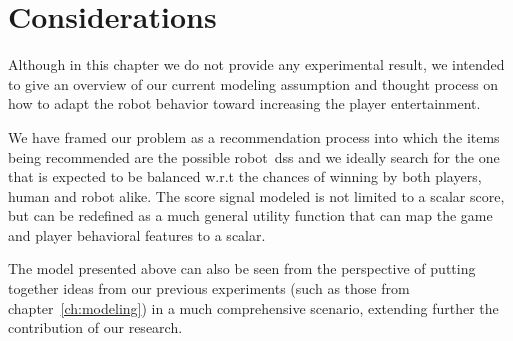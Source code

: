 \section{Considerations}
Although in this chapter we do not provide any experimental result, we intended to give an overview of our current modeling assumption and thought process on how to adapt the robot behavior toward increasing the player entertainment.

We have framed our problem as a recommendation process into which the items being recommended are the possible robot~\glsdesc{ds}s and we ideally search for the one that is expected to be balanced w.r.t the chances of winning by both players, \ie human and robot alike. The score signal modeled is not limited to a scalar score, but can be redefined as a much general utility function that can map the game and player behavioral features to a scalar. 

The model presented above can also be seen from the perspective of putting together ideas from our previous experiments (such as those from chapter~\ref{ch:modeling}) in a much comprehensive scenario, extending further the contribution of our research.
